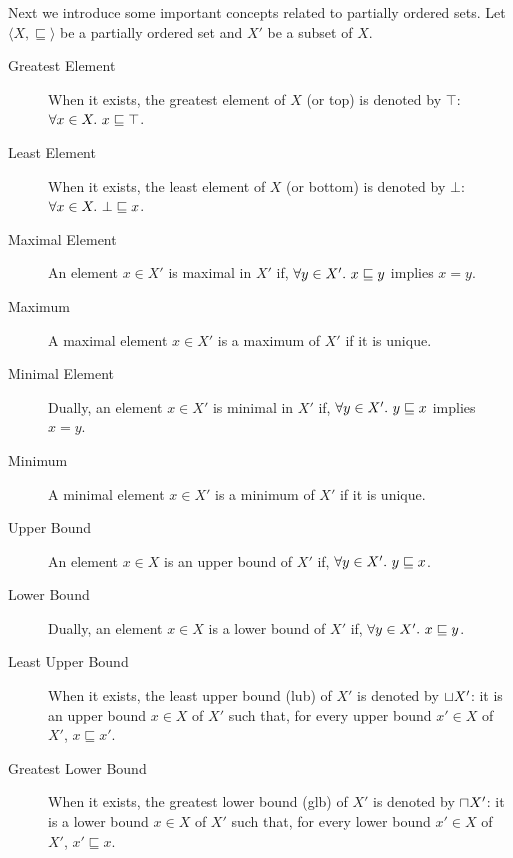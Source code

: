 Next we introduce some important concepts related to partially ordered sets.
Let $\langle X, \sqsubseteq \rangle$ be a partially ordered set and $X'$ be a subset of $X$.
\begin{description}
  \item[Greatest Element] When it exists, the greatest element of $X$ (or top) is denoted by $\top$: $\forall x \in X.~ x \sqsubseteq \top$.
  \item[Least Element] When it exists, the least element of $X$ (or bottom) is denoted by $\bot$: $\forall x \in X.~ \bot \sqsubseteq x$.
  \item[Maximal Element] An element $x \in X'$ is maximal in $X'$ if, $\forall y \in X'.~ x \sqsubseteq y$ implies $x = y$.
  \item[Maximum] A maximal element $x \in X'$ is a maximum of $X'$ if it is unique.
  \item[Minimal Element] Dually, an element $x \in X'$ is minimal in $X'$ if, $\forall y \in X'.~ y \sqsubseteq x$ implies $x = y$.
  \item[Minimum] A minimal element $x \in X'$ is a minimum of $X'$ if it is unique.
  \item[Upper Bound] An element $x \in X$ is an upper bound of $X'$ if, $\forall y \in X'.~ y \sqsubseteq x$.
  \item[Lower Bound] Dually, an element $x \in X$ is a lower bound of $X'$ if, $\forall y \in X'.~ x \sqsubseteq y$.
  \item[Least Upper Bound] When it exists, the least upper bound (lub) of $X'$ is denoted by $\sqcup X'$: it is an upper bound $x \in X$ of $X'$ such that, for every upper bound $x' \in X$ of $X'$, $x \sqsubseteq x'$.
  \item[Greatest Lower Bound] When it exists, the greatest lower bound (glb) of $X'$ is denoted by $\sqcap X'$: it is a lower bound $x \in X$ of $X'$ such that, for every lower bound $x' \in X$ of $X'$, $x' \sqsubseteq x$.
\end{description}

